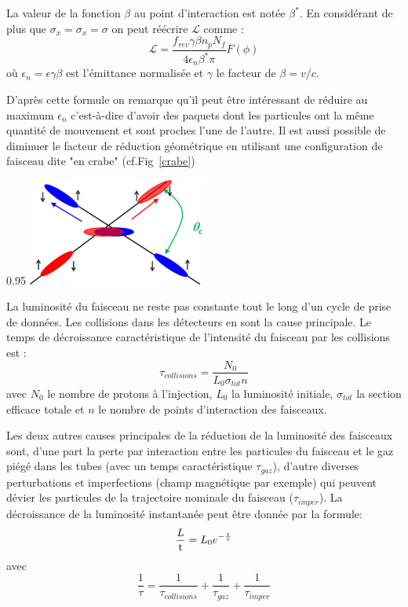 La valeur de la fonction $\beta$ au point d'interaction est notée $\beta^{*}$. En considérant de plus que $\sigma_{x}=\sigma_{x}=\sigma$ on peut réécrire $\mathcal{L}$ comme :
\begin{equation}
\mathcal{L}=\frac{f_{rev}\gamma\beta n_{p}N_{f}}{4\epsilon_{n}\beta^{*}\pi} F(\phi)
\end{equation}
où $\epsilon_{n}=\epsilon\gamma\beta$ est l'émittance normalisée et $\gamma$ le facteur de  $\beta=v/c$.

\newpage
D'après cette formule on remarque qu'il peut être intéressant de réduire au maximum $\epsilon_{n}$ c'est-à-dire d'avoir des paquets dont les particules ont la même quantité de mouvement et sont proches l'une de l'autre. Il est aussi possible de diminuer le facteur de réduction géométrique en utilisant une configuration de faisceau dite "en crabe" (cf.Fig~\ref{crabe})

\begin{minipagewithmarginpars}[ht!]{0.95\textwidth}
\centering
\includegraphics[width=0.45\textwidth]{LHC/crab.png}
\label{crabe}	
\end{minipagewithmarginpars}

La luminosité du faisceau ne reste pas constante tout le long d'un cycle de prise de données. Les collisions dans les détecteurs en sont la cause principale. Le temps de décroissance caractéristique de l'intensité du faisceau par les collisions est :
\begin{equation}
\tau_{collisions}=\frac{N_{0}}{L_{0}\sigma_{tot}n}
\end{equation}
avec $N_{0}$ le nombre de protons à l'injection, $L_{0}$ la luminosité initiale, $\sigma_{tot}$ la section efficace totale et $n$ le nombre de points d'interaction des faisceaux.

Les deux autres causes principales de la réduction de la luminosité des faisceaux sont, d'une part la perte par interaction entre les particules du faisceau et le gaz piégé dans les tubes (avec un temps caractéristique $\tau_{gaz}$), d'autre diverses perturbations et imperfections (champ magnétique par exemple) qui peuvent dévier les particules de la trajectoire nominale du faisceau ($\tau_{imper}$). 
La décroissance de la luminosité instantanée peut être donnée par la formule:
\begin{equation}
\frac{\mathrm \mathcal{L}}{\mathrm t} = L_{0} e^{-\frac{t}{\tau}}
\end{equation}
avec
\begin{equation}
\frac{1}{\tau} = \frac{1}{\tau_{collisions}}+\frac{1}{\tau_{gaz}}+\frac{1}{\tau_{imper}}
\end{equation}

